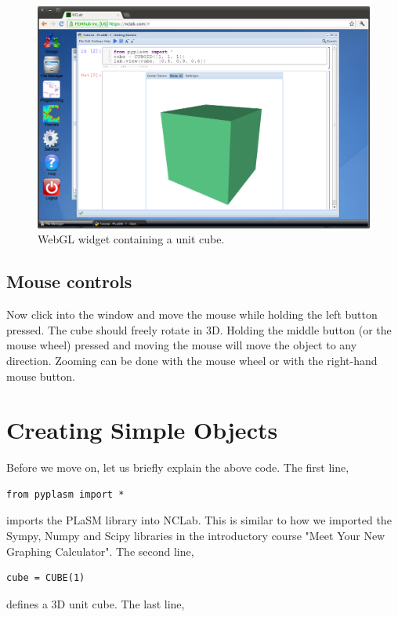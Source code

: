 \documentclass[article,A4,12pt]{llncs}
\begin{document}
\begin{figure}[!ht]
\begin{center}
\includegraphics[width=\textwidth]{img/cube.png}
\end{center}
\caption{WebGL widget containing a unit cube.}
\label{fig:cube}
\end{figure}

\subsection{Mouse controls}

Now click into the window and move the mouse while holding the left
button pressed. The cube should freely rotate in 3D. Holding the middle
button (or the mouse wheel) pressed and moving the mouse will move the 
object to any direction. Zooming can be done with the mouse wheel or
with the right-hand mouse button.

\section{Creating Simple Objects}

Before we move on, let us briefly explain the above code.
The first line, 

\begin{verbatim}
from pyplasm import *
\end{verbatim}
imports the PLaSM library into NCLab. This is similar to how we imported
the Sympy, Numpy and Scipy libraries in the introductory course "Meet Your 
New Graphing Calculator". The second line,

\begin{verbatim}
cube = CUBE(1)
\end{verbatim}
defines a 3D unit cube. The last line,
\end{document}
